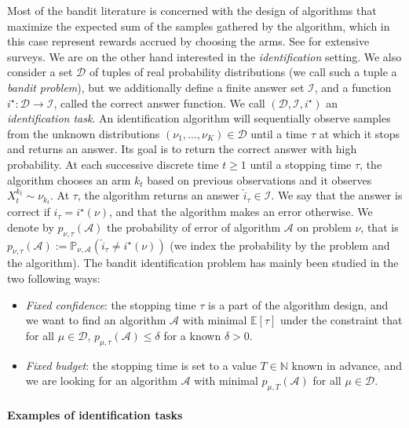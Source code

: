 \documentclass{article}
\begin{document}
Most of the bandit literature is concerned with the design of algorithms that maximize the expected sum of the samples gathered by the algorithm, which in this case represent rewards accrued by choosing the arms.
See \cite{bubeck2012regret,lattimore2020bandit} for extensive surveys.
We are on the other hand interested in the \emph{identification} setting.
We also consider a set $\mathcal D$ of tuples of real probability distributions (we call such a tuple a \emph{bandit problem}), but we additionally define a finite answer set $\mathcal I$, and a function $i^\star : \mathcal D \to \mathcal I$, called the correct answer function.
We call $(\mathcal D, \mathcal I, i^\star)$ an \emph{identification task}.
An identification algorithm will sequentially observe samples from the unknown distributions $(\nu_1, \ldots, \nu_K) \in \mathcal D$ until a time $\tau$ at which it stops and returns an answer.
Its goal is to return the correct answer with high probability.
At each successive discrete time $t \ge 1$ until a stopping time $\tau$, the algorithm chooses an arm $k_t$ based on previous observations and it observes $X_t^{k_t} \sim \nu_{k_t}$.
At $\tau$, the algorithm returns an answer $\hat{i}_\tau \in \mathcal I$. We say that the answer is correct if $\hat{i}_\tau = i^\star(\nu)$, and that the algorithm makes an error otherwise. We denote by $p_{\nu, \tau}(\mathcal A)$ the probability of error of algorithm $\mathcal A$ on problem $\nu$, that is $p_{\nu, \tau}(\mathcal A) := \mathbb{P}_{\nu, \mathcal A}(\hat{i}_\tau \ne i^\star(\nu))$ (we index the probability by the problem and the algorithm).
The bandit identification problem has mainly been studied in the two following ways:
\begin{itemize}
	\item \emph{Fixed confidence}: the stopping time $\tau$ is a part of the algorithm design, and we want to find an algorithm $\mathcal A$ with minimal $\mathbb{E}[\tau]$ under the constraint that for all $\mu \in \mathcal D$, $p_{\mu, \tau}(\mathcal A) \le \delta$ for a known $\delta > 0$.
	\item \emph{Fixed budget}: the stopping time is set to a value $T \in \mathbb{N}$ known in advance, and we are looking for an algorithm $\mathcal A$ with minimal $p_{\mu, T}(\mathcal A)$ for all $\mu \in \mathcal D$.
\end{itemize}


\paragraph{Examples of identification tasks}
\label{par:examples}
\end{document}
